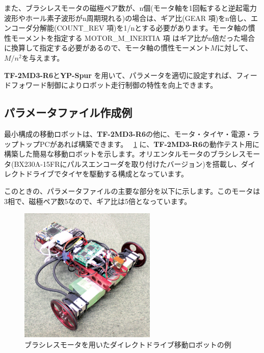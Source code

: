 \documentclass[11pt,a4j,openany,fleqn]{jbook}
\begin{document}
また、ブラシレスモータの磁極ペア数が、n個(モータ軸を1回転すると逆起電力波形やホール素子波形がn周期現れる)の場合は、ギア比(GEAR 項)をn倍し、エンコーダ分解能(COUNT\_REV 項)を1/nとする必要があります。モータ軸の慣性モーメントを指定する MOTOR\_M\_INERTIA 項 はギア比がn倍だった場合に換算して指定する必要があるので、モータ軸の慣性モーメント$M$に対して、$M/n^{2}$を与えます。\par

{\bf TF-2MD3-R6}と{\bf YP-Spur} を用いて、パラメータを適切に設定すれば、フィードフォワード制御によりロボット走行制御の特性を向上できます。\par


\subsection{パラメータファイル作成例}
\label{sec:パラメータ作成例}

最小構成の移動ロボットは、{\bf TF-2MD3-R6}の他に、モータ・タイヤ・電源・ラップトップPCがあれば構築できます。
\figurename~\ref{fig:simple_robot} に、{\bf TF-2MD3-R6}の動作テスト用に構築した簡易な移動ロボットを示します。オリエンタルモータのブラシレスモータ(BX230A-15FRにパルスエンコーダを取り付けたバージョン)を搭載し、ダイレクトドライブでタイヤを駆動する構成となっています。\par
このときの、パラメータファイルの主要な部分を以下に示します。このモータは3相で、磁極ペア数5なので、ギア比は5倍となっています。\par
\begin{figure}[H]
\centering\includegraphics[width=65mm]{simple_robot.eps}
\caption{ブラシレスモータを用いたダイレクトドライブ移動ロボットの例}
\label{fig:simple_robot}
\end{figure}
\end{document}
